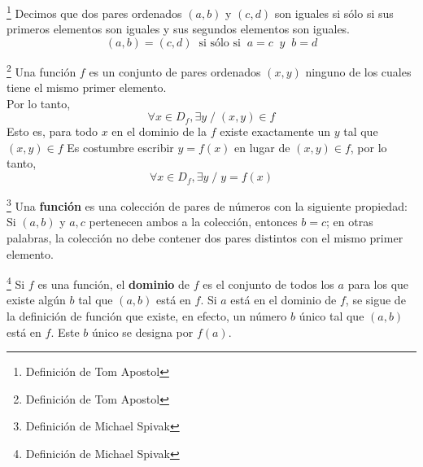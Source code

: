 \begin{tcolorbox}
\begin{def.}\footnote{Definición de Tom Apostol}
Decimos que dos pares ordenados $(a,b)$ \; y \; $(c,d)$ son iguales si sólo si sus primeros elementos son iguales y sus segundos elementos son iguales.\\  $$(a,b)=(c,d) \; \; \mbox{si sólo si} \; \; a=c \; \; y  \; \; b=d$$
\end{def.}

\begin{def.}\footnote{Definición de Tom Apostol}
Una función $f$ es un conjunto de pares ordenados $(x,y)$ ninguno de los cuales tiene el mismo primer elemento.\\
Por lo tanto, $$\forall x \in D_f, \exists y \; /\; (x,y)\in f$$ 
Esto es, para todo $x$ en el dominio de la $f$ existe exactamente un $y$ tal que $(x,y) \in f$
Es costumbre escribir $y=f(x)$ en lugar de $(x,y)\in f$, por lo tanto, $$\forall x \in D_f, \exists y \; / \; y=f(x)$$
\end{def.}
\end{tcolorbox}
\begin{tcolorbox}
\begin{def.} \footnote{Definición de Michael Spivak}
Una \textbf{función} es una colección de pares de números con la siguiente propiedad: Si $(a,b)$ \; y \; $a,c$ pertenecen ambos a la colección, entonces $b=c$; en otras palabras, la colección no debe contener dos pares distintos con el mismo primer elemento.\\
\end{def.}

\begin{def.} \footnote{Definición de Michael Spivak}
Si $f$ es una función, el \textbf{dominio} de $f$ es el conjunto de todos los $a$ para los que existe algún $b$ tal que $(a,b)$ está en $f$. Si $a$ está en el dominio de $f$, se sigue de la definición de función que existe, en efecto, un número $b$ único tal que $(a,b)$ está en $f$. Este $b$ único se designa por $f(a)$.\\



  
\end{def.}
\end{tcolorbox}